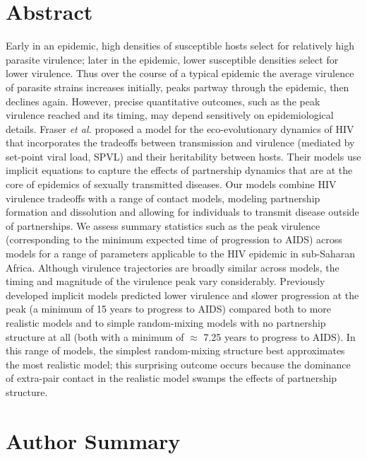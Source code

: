\documentclass[10pt,letterpaper]{article}
\begin{document}
\section*{Abstract}
Early in an epidemic, high densities of susceptible hosts
select for relatively high parasite virulence; later in the epidemic,
lower susceptible densities select for lower virulence.
Thus over the course of a typical epidemic the average virulence 
of parasite strains increases initially,
peaks partway through the epidemic, then declines again.
However, precise quantitative outcomes, such as the peak virulence reached
and its timing, may depend sensitively on epidemiological details. 
Fraser \emph{et al.}
proposed a model for the eco-evolutionary
dynamics of HIV that incorporates
the tradeoffs between transmission and virulence (mediated by
set-point viral load, SPVL) and their heritability between
hosts. Their models use implicit equations to
capture the effects of partnership dynamics that are at the core of 
epidemics of sexually transmitted diseases. 
Our models combine HIV virulence tradeoffs with a range of
contact models, modeling partnership formation and
dissolution and allowing for individuals to transmit disease outside
of partnerships. We assess summary statistics such as the peak virulence
(corresponding to the minimum expected time of progression to AIDS) across
models for a range of 
parameters applicable to the HIV epidemic in sub-Saharan Africa.
Although virulence trajectories are broadly similar
across models, the timing and magnitude of the 
virulence peak vary
considerably.
Previously developed implicit models predicted 
lower virulence and slower progression
at the peak (a minimum of 15 years to
progress to AIDS) compared both to more realistic models
and to simple random-mixing models with no partnership structure
at all (both with a minimum of $\approx$ 7.25 years to progress to AIDS).
In this range of models, the simplest random-mixing structure best
approximates the most realistic model; this
surprising outcome occurs because the dominance of extra-pair
contact in the realistic model swamps the effects of
partnership structure.

\section*{Author Summary}
\end{document}
